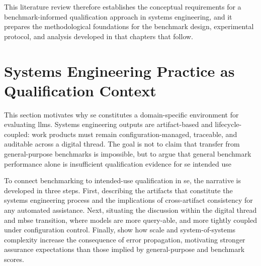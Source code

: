 This literature review therefore establishes the conceptual requirements for a benchmark-informed qualification approach in systems engineering, and it prepares the methodological foundations for the benchmark design, experimental protocol, and analysis developed in that chapters that follow.



\section{Systems Engineering Practice as Qualification Context}
\label{sec:ch2_se_practice_qualification_context}



This section motivates why \ac{se} constitutes a domain-specific environment for evaluating \acp{llm}. Systems engineering outputs are artifact-based and lifecycle-coupled: work products must remain configuration-managed, traceable, and auditable across a digital thread. The goal is not to claim that transfer from general-purpose benchmarks is impossible, but to argue that general benchmark performance alone is insufficient qualification evidence for \ac{se} intended use \cite{walden_systems_engineering_handbook_2015, standard_ieee_15288_2023, deputyassistantsecretaryofdefense_DepartmentDefenseDigitalStrategy_2018}

To connect benchmarking to intended-use qualification in \ac{se}, the narrative is developed in three steps. First, describing the artifacts that constitute the systems engineering process and the implications of cross-artifact consistency for any automated assistance. Next, situating the discussion within the digital thread and \ac{mbse} transition, where models are more query-able, and more tightly coupled under configuration control. Finally, show how scale and system-of-systems complexity increase the consequence of error propagation, motivating stronger assurance expectations than those implied by general-purpose and benchmark scores.



